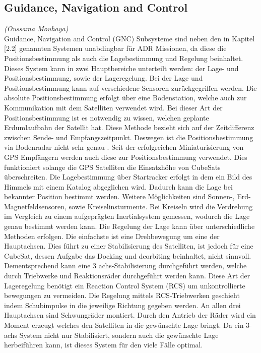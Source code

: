 		\subsection{Guidance, Navigation and Control}
		\hfill\emph{(Oussama Mouhaya)}\\
Guidance, Navigation and Control (GNC) Subsysteme sind neben den in Kapitel [2.2] genannten Systemen unabdingbar für ADR Missionen, da diese die Positionsbestimmung als auch die Lagebestimmung und Regelung beinhaltet. Dieses System kann in zwei Hauptbereiche unterteilt werden: der Lage- und Positionsbestimmung, sowie der Lageregelung.
Bei der Lage und Positionsbestimmung kann auf verschiedene Sensoren zurückgegriffen werden. Die absolute Positionsbestimmung erfolgt über eine Bodenstation, welche auch zur Kommunikation mit dem Satelliten verwendet wird. Bei dieser Art der Positionsbestimmung ist es notwendig zu wissen, welchen geplante Erdumlaufbahn der Satellit hat. Diese Methode bezieht sich auf der Zeitdifferenz zwischen Sende- und Empfangszeitpunkt. Deswegen ist die Positionsbestimmung via Bodenradar nicht sehr genau \cite{.d}. Seit der erfolgreichen Miniaturisierung  von GPS Empfängern werden auch diese zur Positionsbestimmung verwendet. Dies funktioniert solange die GPS Satelliten die Einsatzhöhe von CubeSats überschreiten. Die Lagebestimmung über Startracker erfolgt in dem ein Bild des Himmels mit einem Katalog abgeglichen wird. Dadurch kann die Lage bei bekannter Position bestimmt werden. Weitere Möglichkeiten sind Sonnen-, Erd- Magnetfeldsensoren, sowie Kreiselinsturmente. Bei Kreiseln wird die Verdrehung im Vergleich zu einem aufgeprägten Inertialsystem gemessen, wodurch die Lage genau bestimmt werden kann. 
Die Regelung  der Lage kann über unterschiedliche Methoden erfolgen. Die einfachste ist eine Drehbewegung um eine der Hauptachsen. Dies führt zu einer Stabilisierung des Satelliten, ist jedoch für eine CubeSat, dessen Aufgabe das Docking und deorbiting beinhaltet, nicht sinnvoll. Dementsprechend kann eine 3 achs-Stabilisierung durchgeführt werden, welche durch Triebwerke und Reaktionsräder durchgeführt werden kann. Diese Art der Lageregelung benötigt ein Reaction Control System (RCS) um unkontrollierte bewegungen zu vermeiden. Die Regelung mittels RCS-Triebwerken geschieht indem Schubimpulse in die jeweilige Richtung gegeben werden. An allen drei Hauptachsen sind Schwungräder montiert. Durch den Antrieb der Räder wird ein Moment erzeugt welches den Satelliten in die gewünschte Lage bringt. Da ein 3-achs System nicht nur Stabilisiert, sondern auch die gewünschte Lage herbeiführen kann, ist dieses System für den viele Fälle optimal.\cite{Lettau.}

